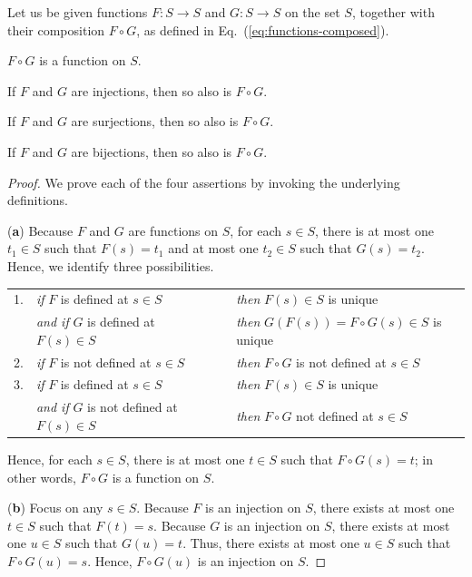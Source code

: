 \begin{prop}
\label{thm:fn-composition}
Let us be given functions $F: S \rightarrow S$ and $G: S \rightarrow S$ on the set $S$, together with their composition $F \circ G$, as defined in Eq.~(\ref{eq:functions-composed}).

$F \circ G$ is a function on $S$.

If $F$ and $G$ are injections, then so also is $F \circ G$.

If $F$ and $G$ are surjections, then so also is $F \circ G$.

If $F$ and $G$ are bijections, then so also is $F \circ G$.
\end{prop}

\begin{proof}
We prove each of the four assertions by invoking the underlying definitions.

\noindent ({\bf a})
Because $F$ and $G$ are functions on $S$, for each $s \in S$, there is at most one $t_1 \in S$ such that $F(s) = t_1$ and at most one $t_2 \in S$ such that $G(s) = t_2$.  Hence, we identify three possibilities.

\smallskip

\begin{tabular}{lllll}
1. &
{\em if} $F$ is defined at $s \in S$  & & & {\em then} $F(s) \in S$ is unique \\
  &
{\em and if} $G$ is defined at $F(s) \in S$ & & & {\em then} $G(F(s)) = F \circ G(s) \in S$ is unique \\
2. &
{\em if} $F$ is not defined at $s \in S$ & & & {\em then} $F \circ G$ is not defined at $s \in S$ \\ 
3. & 
{\em if} $F$ is defined at $s \in S$ & & & {\em then} $F(s) \in S$ is unique \\
  &
{\em and if} $G$ is not defined at $F(s) \in S$ & & & {\em then} $F \circ G$ not defined at $s \in S$ 
\end{tabular}

\smallskip

\noindent
Hence, for each $s \in S$, there is at most one $t \in S$ such that $F \circ G(s) = t$; in other words, $F \circ G$ is a function on $S$.

\medskip

\noindent ({\bf b})
Focus on any $s \in S$.  Because $F$ is an injection on $S$, there exists at most one $t \in S$ such that $F(t) = s$.  Because $G$ is an injection on $S$, there exists at most one $u \in S$ such that $G(u) = t$.  Thus, there exists at most one $u \in S$ such that $F \circ G(u) = s$.  Hence, $F \circ G(u)$ is an injection on $S$.


\end{proof}
